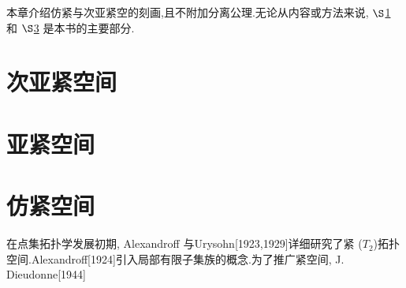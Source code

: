 \documentclass[main.tex]{subfiles}
\begin{document}
本章介绍仿紧与次亚紧空的刻画,且不附加分离公理.无论从内容或方法来说, $\S$\ref{ch2.1} 和 $\S$\ref{ch2.3} 是本书的主要部分.
\section{次亚紧空间}\label{ch2.1}

\section{亚紧空间}\label{ch2.2}




\section{仿紧空间}\label{ch2.3}
在点集拓扑学发展初期, Alexandroff 与Urysohn[1923,1929]详细研究了紧
($T_2$)拓扑空间.Alexandroff[1924]引入局部有限子集族的概念.为了推广紧空间, J. Dieudonne[1944]
	
\end{document}
